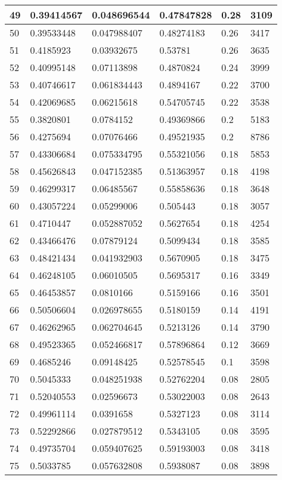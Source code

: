 \begin{longtable}{|l|l|l|l|l|l|}
49 & 0.39414567 & 0.048696544 & 0.47847828 & 0.28 & 3109 \\ \hline 
50 & 0.39533448 & 0.047988407 & 0.48274183 & 0.26 & 3417 \\ \hline 
51 & 0.4185923 & 0.03932675 & 0.53781 & 0.26 & 3635 \\ \hline 
52 & 0.40995148 & 0.07113898 & 0.4870824 & 0.24 & 3999 \\ \hline 
53 & 0.40746617 & 0.061834443 & 0.4894167 & 0.22 & 3700 \\ \hline 
54 & 0.42069685 & 0.06215618 & 0.54705745 & 0.22 & 3538 \\ \hline 
55 & 0.3820801 & 0.0784152 & 0.49369866 & 0.2 & 5183 \\ \hline 
56 & 0.4275694 & 0.07076466 & 0.49521935 & 0.2 & 8786 \\ \hline 
57 & 0.43306684 & 0.075334795 & 0.55321056 & 0.18 & 5853 \\ \hline 
58 & 0.45626843 & 0.047152385 & 0.51363957 & 0.18 & 4198 \\ \hline 
59 & 0.46299317 & 0.06485567 & 0.55858636 & 0.18 & 3648 \\ \hline 
60 & 0.43057224 & 0.05299006 & 0.505443 & 0.18 & 3057 \\ \hline 
61 & 0.4710447 & 0.052887052 & 0.5627654 & 0.18 & 4254 \\ \hline 
62 & 0.43466476 & 0.07879124 & 0.5099434 & 0.18 & 3585 \\ \hline 
63 & 0.48421434 & 0.041932903 & 0.5670905 & 0.18 & 3475 \\ \hline 
64 & 0.46248105 & 0.06010505 & 0.5695317 & 0.16 & 3349 \\ \hline 
65 & 0.46453857 & 0.0810166 & 0.5159166 & 0.16 & 3501 \\ \hline 
66 & 0.50506604 & 0.026978655 & 0.5180159 & 0.14 & 4191 \\ \hline 
67 & 0.46262965 & 0.062704645 & 0.5213126 & 0.14 & 3790 \\ \hline 
68 & 0.49523365 & 0.052466817 & 0.57896864 & 0.12 & 3669 \\ \hline 
69 & 0.4685246 & 0.09148425 & 0.52578545 & 0.1 & 3598 \\ \hline 
70 & 0.5045333 & 0.048251938 & 0.52762204 & 0.08 & 2805 \\ \hline 
71 & 0.52040553 & 0.02596673 & 0.53022003 & 0.08 & 2643 \\ \hline 
72 & 0.49961114 & 0.0391658 & 0.5327123 & 0.08 & 3114 \\ \hline 
73 & 0.52292866 & 0.027879512 & 0.5343105 & 0.08 & 3595 \\ \hline 
74 & 0.49735704 & 0.059407625 & 0.59193003 & 0.08 & 3418 \\ \hline 
75 & 0.5033785 & 0.057632808 & 0.5938087 & 0.08 & 3898 \\ \hline 
\end{longtable}
